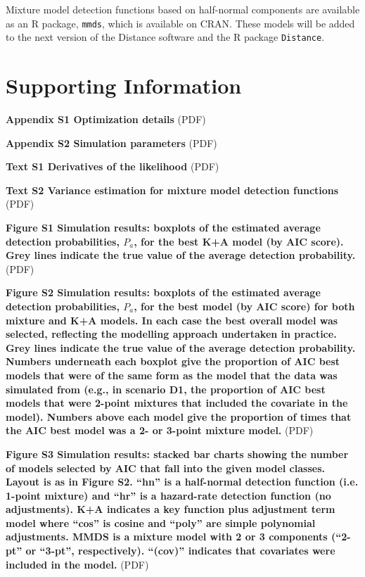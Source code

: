 \documentclass[10pt]{article}
\begin{document}
Mixture model detection functions based on half-normal components are available as an \textsf{R} package, \texttt{mmds}, which is available on CRAN. These models will be added to the next version of the Distance software and the \textsf{R} package \texttt{Distance}.

\section*{Supporting Information}

\textbf{Appendix S1 Optimization details} (PDF)

\textbf{Appendix S2 Simulation parameters} (PDF)

\textbf{Text S1 Derivatives of the likelihood} (PDF)

\textbf{Text S2 Variance estimation for mixture model detection functions} (PDF)

\textbf{Figure S1 Simulation results: boxplots of the estimated average detection probabilities, $P_a$, for the best K+A model (by AIC score). Grey lines indicate the true value of the average detection probability.} (PDF)

\textbf{Figure S2 Simulation results: boxplots of the estimated average detection probabilities, $P_a$, for the best model (by AIC score) for both mixture and K+A models. In each case the best overall model was selected, reflecting the modelling approach undertaken in practice. Grey lines indicate the true value of the average detection probability. Numbers underneath each boxplot give the proportion of AIC best models that were of the same form as the model that the data was simulated from (e.g., in scenario D1, the proportion of AIC best models that were 2-point mixtures that included the covariate in the model). Numbers above each model give the proportion of times that the AIC best model was a 2- or 3-point mixture model.} (PDF)

\textbf{Figure S3 Simulation results: stacked bar charts showing the number of models selected by AIC that fall into the given model classes. Layout is as in Figure S2. ``hn'' is a half-normal detection function (i.e. 1-point mixture) and ``hr'' is a hazard-rate detection function (no adjustments). K+A indicates a key function plus adjustment term model where ``cos'' is cosine and ``poly'' are simple polynomial adjustments. MMDS is a mixture model with 2 or 3 components (``2-pt'' or ``3-pt'', respectively). ``(cov)'' indicates that covariates were included in the model.} (PDF)
\end{document}
